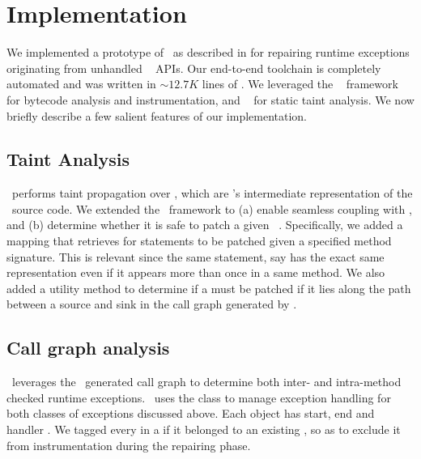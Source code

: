 \section{Implementation}
\label{sec:implementation}

We implemented a prototype of \tool\ as described in  for
repairing runtime exceptions originating from unhandled \java\ 
APIs. Our end-to-end toolchain is completely automated and was written in
$\sim$$12.7K$ lines of \java. We leveraged the \soot~\cite{soot} framework for
bytecode analysis and instrumentation, and \infoflow~\cite{infoflow} for static
taint analysis. We now briefly describe a few salient features of our
implementation.

\subsection{Taint Analysis}

\infoflow\ performs taint propagation over , which are \soot's
intermediate representation of the \java\ source code. We extended the
\infoflow\ framework to (a) enable seamless coupling with \soot, and (b)
determine whether it is safe to patch a given \soot\ . Specifically,
we added a mapping that retrieves  for statements to be patched
given a specified method signature. This is relevant since the same statement,
say  has the exact same representation even if it appears more
than once in a same method. We also added a utility method to determine if a
 must be patched if it lies along the path between a source and sink 
in the call graph generated by \soot.

\subsection{Call graph analysis}
\label{subsec:callChainLookUp}

\tool\ leverages the \soot\ generated call graph to determine both inter- and
intra-method checked runtime exceptions. \soot\ uses the  class to
manage exception handling for both classes of exceptions discussed above. Each
 object has start, end and handler . We tagged every
 in a  if it belonged to an existing , so as
to exclude it from instrumentation during the repairing phase.
% 

